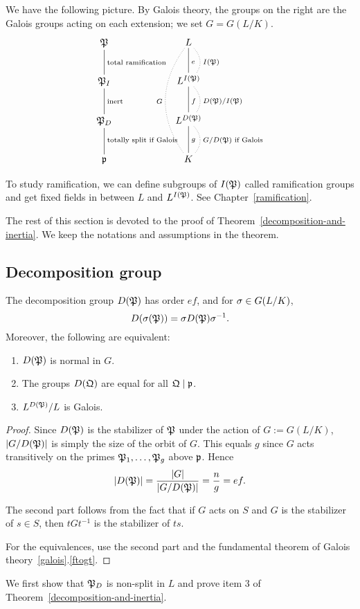 We have the following picture. By Galois theory, the groups on the right are the Galois groups acting on each extension; we set $G=G(L/K)$.
\[
\xymatrixcolsep{5pc}\xymatrix{
\mP\ar@{-}[d]^{\text{total ramification}} &
L\ar@{-}[d]^{e}\ar@/^1pc/@{.}[d]^{I(\mP)}
\ar@/_2pc/@{.}[ddd]_{G}\\
\mP_I\ar@{-}[d]^{\text{inert}} &
L^{I(\mP)}\ar@{-}[d]^f\ar@/^1pc/@{.}[d]^{D(\mP)/I(\mP)}\\
\mP_D\ar@{-}[d]^{\text{totally split if Galois}}&
L^{D(\mP)}\ar@{-}[d]^g\ar@/^1pc/@{.}[d]^{G/D(\mP)\text{ if Galois}}\\
\mfp&K
}
\]
\begin{rem}
To study ramification, we can define subgroups of $I(\mathfrak{P})$ called ramification groups and get fixed fields in between $L$ and $L^{I(\mathfrak{P})}$. See Chapter~\ref{ramification}.
\end{rem}
The rest of this section is devoted to the proof of Theorem~\ref{decomposition-and-inertia}. We keep the notations and assumptions in the theorem.
\subsection{Decomposition group}
\begin{pr}
The decomposition group $D(\mathfrak{P})$ has order $ef$, and for $\sigma\in G(L/K)$,
\[
D(\sigma(\mathfrak{P}))=\sigma D(\mathfrak{P}) \sigma^{-1}.
\]
Moreover, the following are equivalent:
\begin{enumerate}
\item $D(\mathfrak{P})$ is normal in $G$.
\item The groups $D(\mathfrak{Q})$ are equal for all $\mathfrak{Q}\mid \mathfrak{p}$.
\item $L^{D(\mathfrak{P})}/L$ is Galois.
\end{enumerate}
\end{pr}
\begin{proof}
 Since $D(\mathfrak{P})$ is the stabilizer of $\mathfrak{P}$ under the action of $G:=G(L/K)$,  
$|G/D(\mathfrak{P})|$ is simply the size of the orbit of $G$. This equals $g$ since $G$ acts transitively on the primes $\mathfrak{P}_1,\ldots, \mathfrak{P}_g$ above $\mathfrak{p}$.
Hence
\[
|D(\mathfrak{P})|=\frac{|G|}{|G/D(\mathfrak{P})|}=\frac{n}{g}=ef.
\]

The second part follows from the fact that if $G$ acts on $S$ and $G$ is the stabilizer of $s\in S$, then $tGt^{-1}$ is the stabilizer of $ts$.

For the equivalences, use the second part and the fundamental theorem of Galois theory~\ref{galois}.\ref{ftogt}.
\end{proof}
We first show that $\mathfrak{P}_D$ is non-split in $L$ and prove item 3 of Theorem~\ref{decomposition-and-inertia}.


